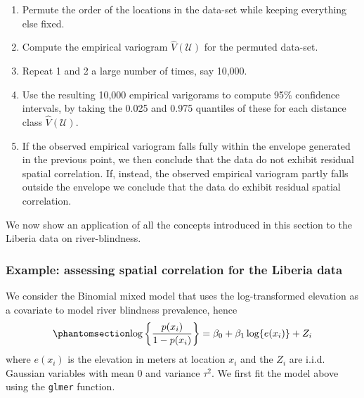 \documentclass[
  letterpaper,
]{krantz}
\begin{document}
\begin{enumerate}
\def\labelenumi{\arabic{enumi}.}
\item
  Permute the order of the locations in the data-set while keeping
  everything else fixed.
\item
  Compute the empirical variogram \(\hat{V}(\mathcal{U})\) for the
  permuted data-set.
\item
  Repeat 1 and 2 a large number of times, say 10,000.
\item
  Use the resulting 10,000 empirical varigorams to compute 95\(\%\)
  confidence intervals, by taking the 0.025 and 0.975 quantiles of these
  for each distance class \(\hat{V}(\mathcal{U})\).
\item
  If the observed empirical variogram falls fully within the envelope
  generated in the previous point, we then conclude that the data do not
  exhibit residual spatial correlation. If, instead, the observed
  empirical variogram partly falls outside the envelope we conclude that
  the data do exhibit residual spatial correlation.
\end{enumerate}

We now show an application of all the concepts introduced in this
section to the Liberia data on river-blindness.

\subsubsection{Example: assessing spatial correlation for the Liberia
data}\label{sec-empirical-variog-bin}

We consider the Binomial mixed model that uses the log-transformed
elevation as a covariate to model river blindness prevalence, hence
\begin{equation}\phantomsection\label{eq-liberia-bin-mixed-elev}{
\log\left\{\frac{p(x_i)}{1-p(x_i)}\right\} = \beta_{0} + \beta_{1}\log\{e(x_i)\} + Z_i
}\end{equation} where \(e(x_i)\) is the elevation in meters at location
\(x_i\) and the \(Z_i\) are i.i.d. Gaussian variables with mean 0 and
variance \(\tau^2\). We first fit the model above using the
\texttt{glmer} function.
\end{document}
